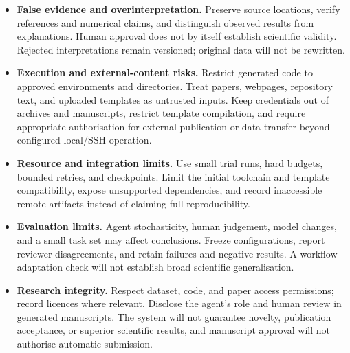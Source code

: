 \documentclass[11pt]{article}
\begin{document}
\begin{itemize}[leftmargin=*,itemsep=0.35em]
\item \textbf{False evidence and overinterpretation.} Preserve source locations, verify references and numerical claims, and distinguish observed results from explanations. Human approval does not by itself establish scientific validity. Rejected interpretations remain versioned; original data will not be rewritten.
\item \textbf{Execution and external-content risks.} Restrict generated code to approved environments and directories. Treat papers, webpages, repository text, and uploaded templates as untrusted inputs. Keep credentials out of archives and manuscripts, restrict template compilation, and require appropriate authorisation for external publication or data transfer beyond configured local/SSH operation.
\item \textbf{Resource and integration limits.} Use small trial runs, hard budgets, bounded retries, and checkpoints. Limit the initial toolchain and template compatibility, expose unsupported dependencies, and record inaccessible remote artifacts instead of claiming full reproducibility.
\item \textbf{Evaluation limits.} Agent stochasticity, human judgement, model changes, and a small task set may affect conclusions. Freeze configurations, report reviewer disagreements, and retain failures and negative results. A workflow adaptation check will not establish broad scientific generalisation.
\item \textbf{Research integrity.} Respect dataset, code, and paper access permissions; record licences where relevant. Disclose the agent's role and human review in generated manuscripts. The system will not guarantee novelty, publication acceptance, or superior scientific results, and manuscript approval will not authorise automatic submission.
\end{itemize}



\end{document}
